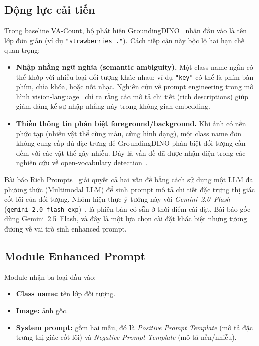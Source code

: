 \documentclass[a4paper,12pt]{report}
\numberwithin{figure}{chapter}
\numberwithin{table}{chapter}
\begin{document}
\subsection{Động lực cải tiến}

Trong baseline VA-Count, bộ phát hiện GroundingDINO~\cite{groundingdino} nhận đầu vào là tên lớp đơn giản (ví dụ \texttt{"strawberries ."}). Cách tiếp cận này bộc lộ hai hạn chế quan trọng:

\begin{itemize}
    \item \textbf{Nhập nhằng ngữ nghĩa (semantic ambiguity).} Một class name ngắn có thể khớp với nhiều loại đối tượng khác nhau: ví dụ \texttt{"key"} có thể là phím bàn phím, chìa khóa, hoặc nốt nhạc. Nghiên cứu về prompt engineering trong mô hình vision-language~\cite{coop} chỉ ra rằng các mô tả chi tiết (rich descriptions) giúp giảm đáng kể sự nhập nhằng này trong không gian embedding.
    \item \textbf{Thiếu thông tin phân biệt foreground/background.} Khi ảnh có nền phức tạp (nhiều vật thể cùng màu, cùng hình dạng), một class name đơn không cung cấp đủ đặc trưng để GroundingDINO phân biệt đối tượng cần đếm với các vật thể gây nhiễu. Đây là vấn đề đã được nhận diện trong các nghiên cứu về open-vocabulary detection~\cite{ovdet_survey}.
\end{itemize}

Bài báo Rich Prompts~\cite{richprompts} giải quyết cả hai vấn đề bằng cách sử dụng một LLM đa phương thức (Multimodal LLM) để sinh prompt mô tả chi tiết đặc trưng thị giác cốt lõi của đối tượng. Nhóm hiện thực ý tưởng này với \emph{Gemini~2.0~Flash} (\texttt{gemini-2.0-flash-exp})~\cite{gemini}, là phiên bản có sẵn ở thời điểm cài đặt. Bài báo gốc dùng Gemini~2.5~Flash, và đây là một lựa chọn cài đặt khác biệt nhưng tương đương về vai trò sinh enhanced prompt.

\subsection{Module Enhanced Prompt}
\label{subsec:enhanced-prompt}

Module nhận ba loại đầu vào:
\begin{itemize}
    \item \textbf{Class name:} tên lớp đối tượng.
    \item \textbf{Image:} ảnh gốc.
    \item \textbf{System prompt:} gồm hai mẫu, đó là \textit{Positive Prompt Template} (mô tả đặc trưng thị giác cốt lõi) và \textit{Negative Prompt Template} (mô tả nền/nhiễu).
\end{itemize}
\end{document}
